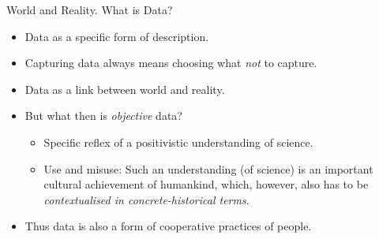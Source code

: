 \documentclass{beamer}
\begin{document}
\begin{frame}{World and Reality. What is Data?}
  \begin{itemize}
  \item Data as a specific form of description.
  \item Capturing data always means choosing what \emph{not} to capture.
  \item Data as a link between world and reality.
  \item But what then is \emph{objective} data?
    \begin{itemize}
    \item Specific reflex of a positivistic understanding of science.
    \item Use and misuse: Such an understanding (of science) is an important
      cultural achievement of humankind, which, however, also has to be
      \emph{contextualised in concrete-historical terms}.
    \end{itemize}
  \item Thus data is also a form of cooperative practices of people.
  \end{itemize}
\end{frame}
\end{document}
